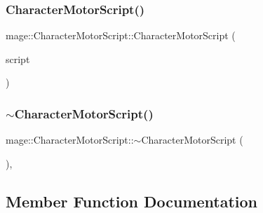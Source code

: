 \hypertarget{classmage_1_1_character_motor_script_a04180b7c00a5c1c309fe8b1b44f6fd10}{}\label{classmage_1_1_character_motor_script_a04180b7c00a5c1c309fe8b1b44f6fd10} 
\subsubsection{\texorpdfstring{Character\+Motor\+Script()}{CharacterMotorScript()}\hspace{0.1cm}{\footnotesize\ttfamily [3/3]}}
{\footnotesize\ttfamily mage\+::\+Character\+Motor\+Script\+::\+Character\+Motor\+Script (\begin{DoxyParamCaption}\item[{\hyperlink{classmage_1_1_character_motor_script}{Character\+Motor\+Script} \&\&}]{script }\end{DoxyParamCaption})\hspace{0.3cm}{\ttfamily [default]}}

\hypertarget{classmage_1_1_character_motor_script_a97b98828d964a0ce38cc424bbf080303}{}\label{classmage_1_1_character_motor_script_a97b98828d964a0ce38cc424bbf080303} 
\subsubsection{\texorpdfstring{$\sim$\+Character\+Motor\+Script()}{~CharacterMotorScript()}}
{\footnotesize\ttfamily mage\+::\+Character\+Motor\+Script\+::$\sim$\+Character\+Motor\+Script (\begin{DoxyParamCaption}{ }\end{DoxyParamCaption})\hspace{0.3cm}{\ttfamily [virtual]}, {\ttfamily [default]}}



\subsection{Member Function Documentation}
\hypertarget{classmage_1_1_character_motor_script_ae3495d6cf8f0677dbe98196d4153ac8d}{}\label{classmage_1_1_character_motor_script_ae3495d6cf8f0677dbe98196d4153ac8d} 
